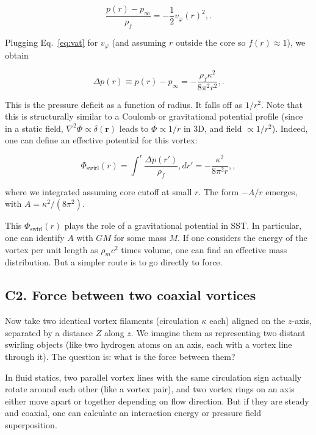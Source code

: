 \documentclass[10pt,reprint,aps,onecolumn,nofootinbib]{revtex4-2}
\newcommand{\rhoF}{\rho_{\!f}}     %
\newcommand{\rhoM}{\rho_{\!m}}     %
\begin{document}
\begin{equation}
\frac{p(r) - p_{\infty}}{\rhoF} = -\frac{1}{2} v_\varphi(r)^2,.
\label{eq:BernPressure}
\end{equation}

Plugging Eq.~\eqref{eq:vat} for $v_\varphi$ (and assuming $r$ outside the core so $f(r)\approx 1$), we obtain

\begin{equation}
\label{eq:pressuredrop}
\Delta p(r) \equiv p(r) - p_{\infty} = -\frac{\rhoF \kappa^2}{8\pi^2 r^2},.
\end{equation}

This is the pressure deficit as a function of radius. It falls off as $1/r^2$. Note that this is structurally similar to a Coulomb or gravitational potential profile (since in a static field, $\nabla^2 \Phi \propto \delta(\mathbf{r})$ leads to $\Phi \propto 1/r$ in 3D, and field $\propto 1/r^2$). Indeed, one can define an effective potential for this vortex:

\begin{equation}
    \Phi_{\text{swirl}}(r) = \int^r \frac{\Delta p(r')}{\rhoF}, dr' = -\frac{\kappa^2}{8\pi^2 r},,
\end{equation}

where we integrated assuming core cutoff at small $r$. The form $-A/r$ emerges, with $A = \kappa^2/(8\pi^2)$.


This $\Phi_{\text{swirl}}(r)$ plays the role of a gravitational potential in SST. In particular, one can identify $A$ with $G M$ for some mass $M$. If one considers the energy of the vortex per unit length as $\rhoM c^2$ times volume, one can find an effective mass distribution. But a simpler route is to go directly to force.


\subsection*{C2. Force between two coaxial vortices}

Now take two identical vortex filaments (circulation $\kappa$ each) aligned on the $z$-axis, separated by a distance $Z$ along $z$. We imagine them as representing two distant swirling objects (like two hydrogen atoms on an axis, each with a vortex line through it). The question is: what is the force between them?


In fluid statics, two parallel vortex lines with the same circulation sign actually rotate around each other (like a vortex pair), and two vortex rings on an axis either move apart or together depending on flow direction. But if they are steady and coaxial, one can calculate an interaction energy or pressure field superposition.
\end{document}
